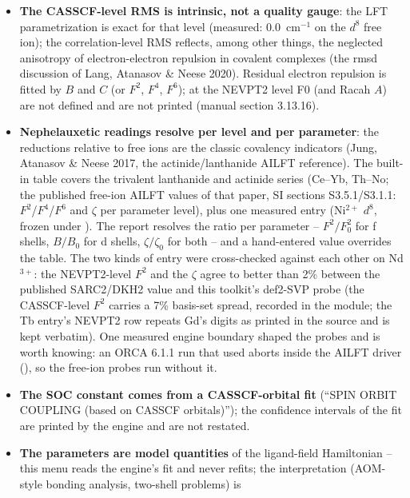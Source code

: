 \begin{readbox}
\begin{itemize}
  \item \textbf{The CASSCF-level RMS is intrinsic, not a quality gauge}:
    the LFT parametrization is exact for that level (measured: 0.0~cm$^{-1}$
    on the $d^8$ free ion); the correlation-level RMS reflects, among
    other things, the neglected anisotropy of electron-electron repulsion
    in covalent complexes (the rmsd discussion of Lang, Atanasov \& Neese
    2020).  Residual electron repulsion is fitted by $B$ and $C$ (or
    $F^2$, $F^4$, $F^6$); at the NEVPT2 level F0 (and Racah $A$) are not
    defined and are not printed (manual section 3.13.16).
  \item \textbf{Nephelauxetic readings resolve per level and per
    parameter}: the reductions relative to free ions are the classic
    covalency indicators (Jung, Atanasov \& Neese 2017, the
    actinide/lanthanide AILFT reference).  The built-in table covers the
    trivalent lanthanide and actinide series (Ce--Yb, Th--No; the
    published free-ion AILFT values of that paper, SI sections
    S3.5.1/S3.1.1: $F^2$/$F^4$/$F^6$ and $\zeta$ per parameter level),
    plus one measured entry (Ni$^{2+}$ $d^8$, frozen under
    ).  The report resolves the ratio per parameter
    -- $F^2/F^2_0$ for f shells, $B/B_0$ for d shells,
    $\zeta/\zeta_0$ for both -- and a hand-entered value overrides the
    table.  The two kinds of entry were cross-checked against each other
    on Nd$^{3+}$: the NEVPT2-level $F^2$ and the $\zeta$ agree to better
    than 2\% between the published SARC2/DKH2 value and this toolkit's
    def2-SVP probe (the CASSCF-level $F^2$ carries a 7\% basis-set
    spread, recorded in the module; the Tb entry's NEVPT2 row repeats
    Gd's digits as printed in the source and is kept verbatim).  One
    measured engine boundary shaped the probes and is worth knowing: an
    ORCA 6.1.1 run that used  aborts inside the AILFT driver
    (), so the free-ion probes
    run without it.
  \item \textbf{The SOC constant comes from a CASSCF-orbital fit}
    (``SPIN ORBIT COUPLING (based on CASSCF orbitals)''); the confidence
    intervals of the fit are printed by the engine and are not restated.
  \item \textbf{The parameters are model quantities} of the ligand-field
    Hamiltonian -- this menu reads the engine's fit and never refits; the
    interpretation (AOM-style bonding analysis, two-shell problems) is

\end{itemize}
\end{readbox}
